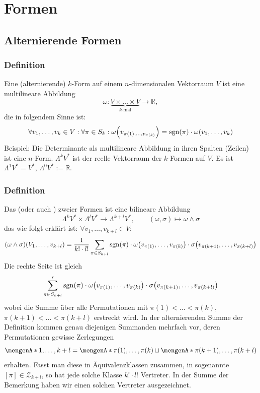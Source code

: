 \section{Formen} %
\label{sec:5}

\subsection{Alternierende Formen} %
\label{sub:51}

\subsubsection[Definition: Alternierende $k$-Form]{Definition} %
\label{ssub:511}
Eine (alternierende) $k$-Form auf einem $n$-dimensionalen Vektorraum $V$ ist eine multilineare Abbildung 
\[
	\omega : \underbrace{V \times \ldots \times V}_{\text{$k$-mal}} \to \mathds{R},
\]
die in folgendem Sinne  ist: 
\[
	\forall v_1, \ldots , v_k \in V : \forall \pi \in S_k : \omega \enbrace*{v_{\pi(1), \ldots , v_{\pi(k)}}} = \sgn(\pi )\cdot  \omega(v_1, \ldots , v_k) 
\]
Beispiel: Die Determinante als multilineare Abbildung in ihren Spalten (Zeilen) ist eine $n$-Form. $\Lambda^k V^*$ ist der reelle Vektorraum der $k$-Formen auf $V$.
Es ist $\Lambda^1 V^* = V^*$, $\Lambda^0 V^* := \mathds{R}$.

\subsubsection[Definition: Äußeres Produkt, Dachprodukt]{Definition} %
\label{ssub:512}
Das  (oder auch ) zweier Formen ist eine bilineare Abbildung 
\[
	\Lambda^k V^* \times \Lambda^l V^* \to \Lambda^{k+l} V^*, \qquad (\omega, \sigma ) \mapsto \omega \wedge \sigma 
\]
das wie folgt erklärt ist: $\forall v_1, \ldots , v_{k+l} \in V :$
\[
	 (\omega \wedge \sigma)(V_1, \ldots , v_{k+l}) = \frac{1}{k! \cdot l!} \sum_{\pi \in S_{k+l}} \sgn(\pi ) \cdot \omega\enbrace*{v_{\pi(1)}, \ldots , v_{\pi(k)}} \cdot 
	 \sigma \enbrace*{v_{\pi(k+1)}, \ldots , v_{\pi(k+l)} }
\]
Die rechte Seite ist gleich
\[
	\sum_{\pi \in S_{k+l}}' \sgn(\pi) \cdot \omega\enbrace*{v_{\pi(1)}, \ldots , v_{\pi(k)}} \cdot \sigma\enbrace*{v_{\pi(k+1)}, \ldots , v_{\pi(k+l)}}
\]
wobei die Summe über alle Permutationen mit $\pi(1) < \ldots < \pi(k)$, $\pi(k+1) < \ldots < \pi(k+l)$ erstreckt wird. In der alternierenden Summe der Definition kommen
genau diejenigen Summanden mehrfach vor, deren Permutationen gewisse Zerlegungen 
\[
	\set{1, \ldots , k+l} = \set{\pi(1), \ldots , \pi(k)} \sqcup \set{\pi(k+1), \ldots , \pi(k+l)}  
\]
erhalten. Fasst man diese in Äquivalenzklassen zusammen, in sogenannte  $[\pi ] \in \mathcal{Z}_{k+l}$, so hat jede solche Klasse $k!\cdot l!$ Vertreter.
In der Summe der Bemerkung haben wir einen solchen Vertreter ausgezeichnet.

